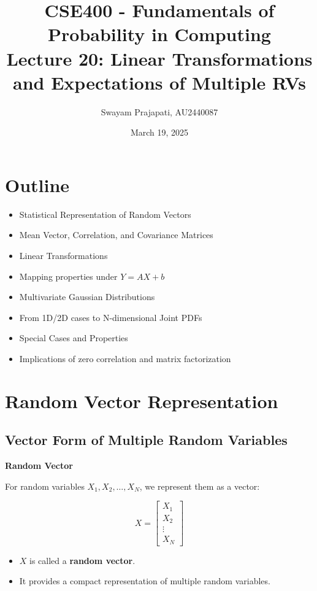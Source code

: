 \documentclass[12pt]{article}
\title{CSE400 - Fundamentals of Probability in Computing\\
Lecture 20: Linear Transformations and Expectations of Multiple RVs}
\author{Swayam Prajapati, AU2440087}
\date{March 19, 2025}
\begin{document}
\maketitle

\section*{Outline}
\begin{itemize}
    \item Statistical Representation of Random Vectors
    \item Mean Vector, Correlation, and Covariance Matrices
    \item Linear Transformations
    \item Mapping properties under $Y = AX + b$
    \item Multivariate Gaussian Distributions
    \item From 1D/2D cases to N-dimensional Joint PDFs
    \item Special Cases and Properties
    \item Implications of zero correlation and matrix factorization
\end{itemize}
\newpage

\section{Random Vector Representation}

\subsection{Vector Form of Multiple Random Variables}

\textbf{Random Vector}

For random variables $X_1, X_2, \dots, X_N$, we represent them as a vector:

\[
X =
\begin{bmatrix}
X_1 \\
X_2 \\
\vdots \\
X_N
\end{bmatrix}
\]

\begin{itemize}
    \item $X$ is called a \textbf{random vector}.
    \item It provides a compact representation of multiple random variables.
\end{itemize}
\end{document}
